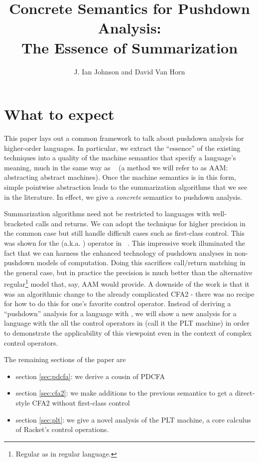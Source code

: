 \documentclass{llncs}
\title{Concrete Semantics for Pushdown Analysis:\\The Essence of Summarization}
\author{J. Ian Johnson and David Van Horn}
\institute{Northeastern University \\
           \email{\{ianj,dvanhorn\}@ccs.neu.edu}}
\newcommand{\Scribtexttt}[1]{{\texttt{#1}}}
\newcommand{\SColorize}[2]{\color{#1}{#2}}
\newcommand{\inColor}[2]{{\Scribtexttt{\SColorize{#1}{#2}}}}
\newcommand{\rackett}[1]{\inColor{black}{#1}}
\begin{document}
\maketitle


\section{What to expect}
This paper lays out a common framework to talk about pushdown analysis
for higher-order languages. In particular, we extract the ``essence''
of the existing techniques into a quality of the machine semantics
that specify a language's meaning, much in the same way as
~\citet{dvanhorn:VanHorn2012Systematic} (a method we will refer to as
AAM: abstracting abstract machines). Once the machine semantics is in
this form, simple pointwise abstraction leads to the summarization
algorithms that we see in the literature. In effect, we give a
\emph{concrete} semantics to pushdown analysis.

Summarization algorithms need not be restricted to languages with
well-bracketed calls and returns. We can adopt the technique for
higher precision in the common case but still handle difficult cases
such as first-class control. This was shown for the
\rackett{call-with-current-continuation} (a.k.a. \rackett{call/cc})
operator in ~\citet{ianjohnson:Vardoulakis2011Pushdown}. This
impressive work illuminated the fact that we can harness the enhanced
technology of pushdown analyses in non-pushdown models of
computation. Doing this sacrifices call/return matching in the general
case, but in practice the precision is much better than the
alternative regular\footnote{Regular as in regular language.} model
that, say, AAM would provide. A downside of the work is that it was an
algorithmic change to the already complicated CFA2 - there was no
recipe for how to do this for one's favorite control operator. Instead
of deriving a ``pushdown'' analysis for a language with
\rackett{call/cc}, we will show a new analysis for a language with the
all the control operators in
\citet{ianjohnson:Flatt:2007:ADC:1291151.1291178} (call it the PLT
machine) in order to demonstrate the applicability of this viewpoint
even in the context of complex control operators.

The remaining sections of the paper are
\begin{itemize}
\item{section \ref{sec:pdcfa}: we derive a cousin of PDCFA}
\item{section \ref{sec:cfa2}: we make additions to the previous semantics to get a direct-style CFA2 without first-class control}
\item{section \ref{sec:plt}: we give a novel analysis of the PLT machine, a core calculus of Racket's control operations.}
\end{itemize}
\end{document}
